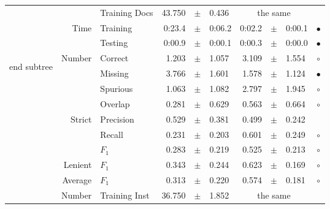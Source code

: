 \begin{longtable}{|r|r|l||rcl|rcl|c|}
\cline{3-10} &                             &   Training Docs &      43.750 &  $\pm$  &       0.436 &    \multicolumn{3}{c|}{the same}         &  \\
\cline{2-10} & \multirow{2}{*}{      Time} &        Training &      0:23.4 &  $\pm$  &      0:06.2 &      0:02.2 &  $\pm$  &      0:00.1 & $\bullet$ \\
\cline{3-10} &                             &         Testing &      0:00.9 &  $\pm$  &      0:00.1 &      0:00.3 &  $\pm$  &      0:00.0 & $\bullet$ \\
\hline
\hline
\multirow{11}{*}{\begin{sideways}end subtree\end{sideways} }
             & \multirow{4}{*}{    Number} &         Correct &       1.203 &  $\pm$  &       1.057 &       3.109 &  $\pm$  &       1.554 & $\circ$ \\
\cline{3-10} &                             &         Missing &       3.766 &  $\pm$  &       1.601 &       1.578 &  $\pm$  &       1.124 & $\bullet$ \\
\cline{3-10} &                             &        Spurious &       1.063 &  $\pm$  &       1.082 &       2.797 &  $\pm$  &       1.945 & $\circ$ \\
\cline{3-10} &                             &         Overlap &       0.281 &  $\pm$  &       0.629 &       0.563 &  $\pm$  &       0.664 & $\circ$ \\
\cline{2-10} & \multirow{3}{*}{    Strict} &       Precision &       0.529 &  $\pm$  &       0.381 &       0.499 &  $\pm$  &       0.242 &  \\
\cline{3-10} &                             &          Recall &       0.231 &  $\pm$  &       0.203 &       0.601 &  $\pm$  &       0.249 & $\circ$ \\
\cline{3-10} &                             &           $F_1$ &       0.283 &  $\pm$  &       0.219 &       0.525 &  $\pm$  &       0.213 & $\circ$ \\
\cline{2-10} &                     Lenient &           $F_1$ &       0.343 &  $\pm$  &       0.244 &       0.623 &  $\pm$  &       0.169 & $\circ$ \\
\cline{2-10} &                     Average &           $F_1$ &       0.313 &  $\pm$  &       0.220 &       0.574 &  $\pm$  &       0.181 & $\circ$ \\
\cline{2-10} & \multirow{2}{*}{    Number} &   Training Inst &      36.750 &  $\pm$  &       1.852 &    \multicolumn{3}{c|}{the same}         &  \\

\end{longtable}
